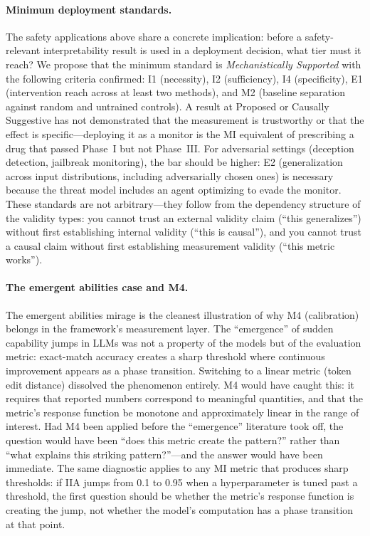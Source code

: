 \documentclass{article}
\begin{document}
\paragraph{Minimum deployment standards.}
The safety applications above share a concrete implication: before a safety-relevant interpretability result is used in a deployment decision, what tier must it reach? We propose that the minimum standard is \emph{Mechanistically Supported} with the following criteria confirmed: I1 (necessity), I2 (sufficiency), I4 (specificity), E1 (intervention reach across at least two methods), and M2 (baseline separation against random and untrained controls). A result at Proposed or Causally Suggestive has not demonstrated that the measurement is trustworthy or that the effect is specific---deploying it as a monitor is the MI equivalent of prescribing a drug that passed Phase~I but not Phase~III. For adversarial settings (deception detection, jailbreak monitoring), the bar should be higher: E2 (generalization across input distributions, including adversarially chosen ones) is necessary because the threat model includes an agent optimizing to evade the monitor. These standards are not arbitrary---they follow from the dependency structure of the validity types: you cannot trust an external validity claim (``this generalizes'') without first establishing internal validity (``this is causal''), and you cannot trust a causal claim without first establishing measurement validity (``this metric works'').

\paragraph{The emergent abilities case and M4.}
The \citet{schaeffer2024emergent} emergent abilities mirage is the cleanest illustration of why M4 (calibration) belongs in the framework's measurement layer. The ``emergence'' of sudden capability jumps in LLMs was not a property of the models but of the evaluation metric: exact-match accuracy creates a sharp threshold where continuous improvement appears as a phase transition. Switching to a linear metric (token edit distance) dissolved the phenomenon entirely. M4 would have caught this: it requires that reported numbers correspond to meaningful quantities, and that the metric's response function be monotone and approximately linear in the range of interest. Had M4 been applied before the ``emergence'' literature took off, the question would have been ``does this metric create the pattern?'' rather than ``what explains this striking pattern?''---and the answer would have been immediate. The same diagnostic applies to any MI metric that produces sharp thresholds: if IIA jumps from 0.1 to 0.95 when a hyperparameter is tuned past a threshold, the first question should be whether the metric's response function is creating the jump, not whether the model's computation has a phase transition at that point.
\end{document}
